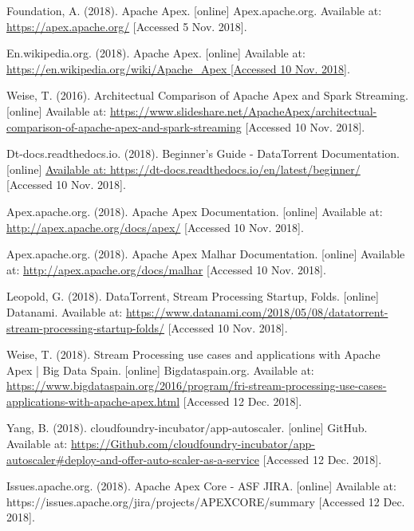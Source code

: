 \documentclass[final]{IEEEtran}
\begin{document}
\begin{thebibliography}{99}
  Foundation, A. (2018). Apache Apex. [online] Apex.apache.org. Available at: \url{https://apex.apache.org/} [Accessed 5 Nov. 2018].
  
  En.wikipedia.org. (2018). Apache Apex. [online] Available at: \url{https://en.wikipedia.org/wiki/Apache_Apex [Accessed 10 Nov. 2018]}.
  
  Weise, T. (2016). Architectual Comparison of Apache Apex and Spark Streaming. [online] Available at: \url{https://www.slideshare.net/ApacheApex/architectual-comparison-of-apache-apex-and-spark-streaming} [Accessed 10 Nov. 2018].

  Dt-docs.readthedocs.io. (2018). Beginner's Guide - DataTorrent Documentation. [online] \url{Available at: https://dt-docs.readthedocs.io/en/latest/beginner/} [Accessed 10 Nov. 2018].

  Apex.apache.org. (2018). Apache Apex Documentation. [online] Available at: \url{http://apex.apache.org/docs/apex/} [Accessed 10 Nov. 2018].

  Apex.apache.org. (2018). Apache Apex Malhar Documentation. [online] Available at: \url{http://apex.apache.org/docs/malhar} [Accessed 10 Nov. 2018].

  Leopold, G. (2018). DataTorrent, Stream Processing Startup, Folds. [online] Datanami. Available at: \url{https://www.datanami.com/2018/05/08/datatorrent-stream-processing-startup-folds/} [Accessed 10 Nov. 2018].

  Weise, T. (2018). Stream Processing use cases and applications with Apache Apex | Big Data Spain. [online] Bigdataspain.org. Available at: \url{https://www.bigdataspain.org/2016/program/fri-stream-processing-use-cases-applications-with-apache-apex.html} [Accessed 12 Dec. 2018].

  Yang, B. (2018). cloudfoundry-incubator/app-autoscaler. [online] GitHub. Available at: \url{https://Github.com/cloudfoundry-incubator/app-autoscaler\#deploy-and-offer-auto-scaler-as-a-service} [Accessed 12 Dec. 2018].

  Issues.apache.org. (2018). Apache Apex Core - ASF JIRA. [online] Available at: https://issues.apache.org/jira/projects/APEXCORE/summary [Accessed 12 Dec. 2018].
\end{thebibliography}
\end{document}
